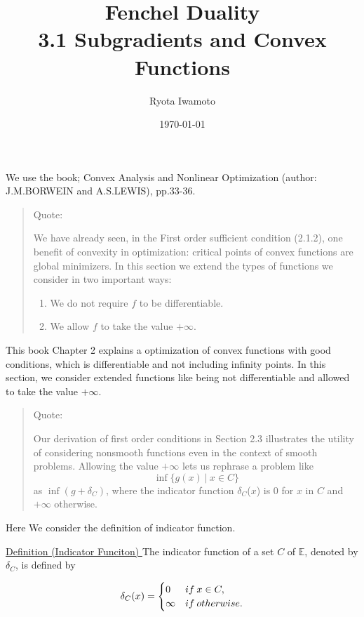 \documentclass[a4paper,11pt]{jsarticle}
\begin{document}
\title{%
  Fenchel Duality  \\
  \large 3.1 Subgradients and Convex Functions}
\author{Ryota Iwamoto}
\date{\today}
\maketitle

We use the book; Convex Analysis and Nonlinear Optimization (author: J.M.BORWEIN and A.S.LEWIS), pp.33-36.

\begin{quote}
  Quote:

  We have already seen, in the First order sufficient condition (2.1.2), one
  benefit of convexity in optimization: critical points of convex functions are
  global minimizers. In this section we extend the types of functions we
  consider in two important ways:

  \qquad
    \begin{enumerate}[label=\roman*,align=CenterWithParen]
      \item We do not require $f$ to be differentiable.
      \item We allow $f$ to take the value $+\infty$.
    \end{enumerate}
\end{quote}

This book Chapter 2 explains a optimization of convex functions with good conditions, which is differentiable and not including infinity points. In this section, we consider extended functions like being not differentiable and allowed to take the value $+\infty$.

\begin{quote}
  Quote:

  Our derivation of first order conditions in Section 2.3  illustrates the utility of considering nonsmooth functions even in the context of smooth problems. Allowing the value $+\infty$ lets us rephrase a problem like
$$ \inf \text{$\{ g(x)\:|\:x \in{C}\}$} $$
as $ \inf \text{$(g+\delta_C)$} $, where the indicator function $\delta_C$($x$) is 0 for $x$ in $C$ and $+\infty$
otherwise.

\end{quote}

Here We consider the definition of indicator function.

\begin{itembox}[l]{\underline{Definition (Indicator Funciton) }}
  The indicator function of a set $C$ of $\mathbb{E}$, denoted by $\delta_C$, is defined by

  \begin{equation}
    \delta_C(x)=
    \begin{cases}
      0 & if\:x \in{C}, \\
      \infty & if\:otherwise. \notag
    \end{cases}
  \end{equation}
\end{itembox}
\end{document}
